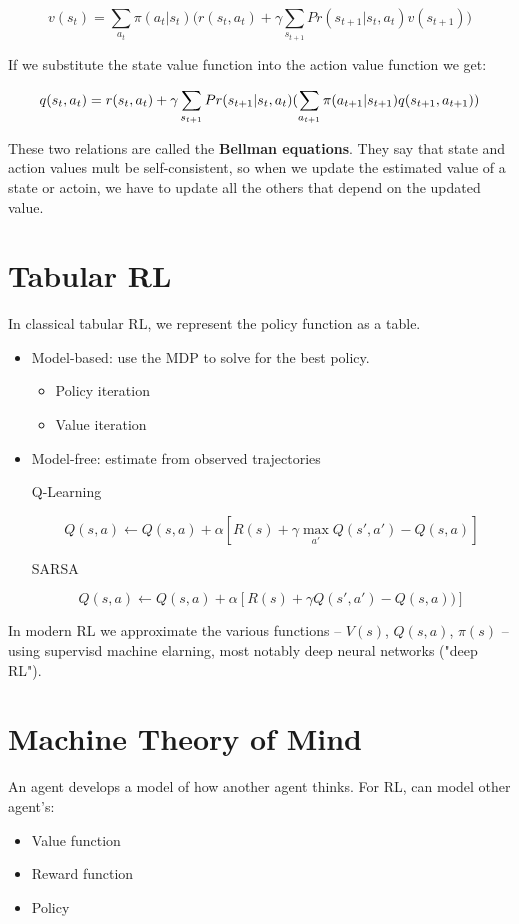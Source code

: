 \documentclass[11pt]{article}
\begin{document}
\[
v(s_t ) = \sum_{a_t} \pi(a_t | s_t) \big( r(s_t, a_t) + \gamma \sum_{s_{t+1}} Pr(s_{t+1} | s_t, a_t) v(s_{t+1})  \big)
\]

If we substitute the state value function into the action value function we get:

\[
q(s_t, a_t) = r(s_t, a_t) + \gamma \sum_{s_{t+1}} Pr(s_{t+1} | s_t, a_t) \Huge( \sum_{a_{t+1}} \pi(a_{t+1} | s_{t+1}) q(s_{t+1}, a_{t+1})  \Huge)
\]

These two relations are called the \textbf{Bellman equations}.  They say that state and action values mult be self-consistent, so when we update the estimated value of a state or actoin, we have to update all the others that depend on the updated value.
\section{Tabular RL}
\label{sec:orga6de144}

In classical tabular RL, we represent the policy function as a table.

\begin{itemize}
\item Model-based: use the MDP to solve for the best policy.

\begin{itemize}
\item Policy iteration
\item Value iteration
\end{itemize}

\item Model-free: estimate from observed trajectories

Q-Learning

\begin{equation}
Q(s, a) \gets Q(s, a) + \alpha [R(s) + \gamma \max_{a'} Q(s', a') - Q(s, a)]
\end{equation}

SARSA

\begin{equation}
Q(s, a) \leftarrow Q(s, a) + \alpha [R(s) + \gamma Q(s', a') - Q(s, a))]
\end{equation}
\end{itemize}

In modern RL we approximate the various functions -- \(V(s)\), \(Q(s, a)\), \(\pi(s)\) -- using supervisd machine elarning, most notably deep neural networks ("deep RL").
\section{Machine Theory of Mind}
\label{sec:orge8f917b}

An agent develops a model of how another agent thinks.  For RL, can model other agent's:

\begin{itemize}
\item Value function
\item Reward function
\item Policy
\end{itemize}
\end{document}
